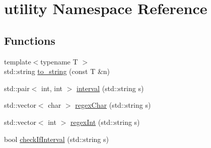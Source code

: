 \hypertarget{namespaceutility}{\section{utility Namespace Reference}
\label{namespaceutility}
}
\subsection*{Functions}
\begin{DoxyCompactItemize}
\item 
{\footnotesize template$<$typename T $>$ }\\std\-::string \hyperlink{namespaceutility_a73ed4d02053486d2503f7e97e5914f50}{to\-\_\-string} (const T \&n)
\item 
std\-::pair$<$ int, int $>$ \hyperlink{namespaceutility_a7e03efd7d7194aaafccad8a2b5ff2d5b}{interval} (std\-::string s)
\item 
std\-::vector$<$ char $>$ \hyperlink{namespaceutility_a16b3d636474a10b8231ad786337bd36c}{regex\-Char} (std\-::string s)
\item 
std\-::vector$<$ int $>$ \hyperlink{namespaceutility_a201a20c977973f497871107c651cce5e}{regex\-Int} (std\-::string s)
\item 
bool \hyperlink{namespaceutility_ade004409d962567243f70199ccbb0110}{check\-If\-Interval} (std\-::string s)
\end{DoxyCompactItemize}


